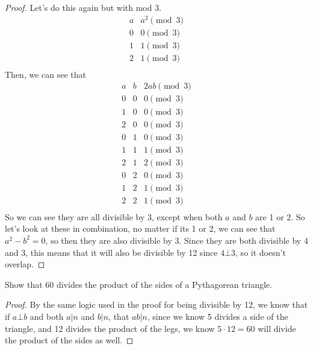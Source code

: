 \documentclass[11pt]{article}
\newenvironment{problem}[2][Problem]{\begin{trivlist}
\item[\hskip \labelsep {\bfseries #1}\hskip \labelsep {\bfseries #2.}]}{\end{trivlist}}
\begin{document}
\begin{proof}
  Let's do this again but with mod 3.
  \[
    \begin{array}{c|c}
      a & a^2 \pmod{3} \\
      \hline
      0 & 0 \pmod{3}   \\
      1 & 1 \pmod{3}   \\
      2 & 1 \pmod{3}   \\
    \end{array}
  \]
  Then, we can see that
  \[
    \begin{array}{c|c|c}
      a & b & 2ab \pmod{3} \\
      \hline
      0 & 0 & 0 \pmod{3}   \\
      1 & 0 & 0 \pmod{3}   \\
      2 & 0 & 0 \pmod{3}   \\
      0 & 1 & 0 \pmod{3}   \\
      1 & 1 & 1 \pmod{3}   \\
      2 & 1 & 2 \pmod{3}   \\
      0 & 2 & 0 \pmod{3}   \\
      1 & 2 & 1 \pmod{3}   \\
      2 & 2 & 1 \pmod{3}   \\
    \end{array}
  \]
  So we can see they are all divisible by 3, except when both $a$ and $b$ are 1 or 2. So let's look at these in combination, no matter if its 1 or 2, we can see that $a^2-b^2=0$, so then they are also divisible by 3.
  Since they are both divisible by 4 and 3, this means that it will also be divisible by 12 since $4\bot 3$, so it doesn't overlap.
\end{proof}




\begin{problem}{11}
Show that 60 divides the product of the sides of a Pythagorean triangle.
\end{problem}

\begin{proof}
  By the same logic used in the proof for being divisible by 12, we know that if $a\bot b$ and both $a|n$ and $b|n$, that $ab|n$, since we know 5 divides a side of the triangle, and 12 divides the product of the legs, we know $5\cdot 12=60$ will divide the product of the sides as well.
\end{proof}
\end{document}
